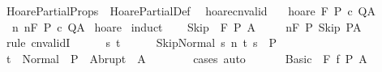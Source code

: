 %
\begin{isabellebody}%
%
%
\isamarkuptrue%
%
\isadelimtheory
%
\endisadelimtheory
%
\isatagtheory
{}\isamarkupfalse%
\ HoarePartialProps\ \ HoarePartialDef\ %
\endisatagtheory
{\isafoldtheory}%
%
\isadelimtheory
%
\endisadelimtheory
%
\isamarkuptrue%
\isamarkupfalse%
\ hoare{\isacharunderscore}cnvalid{\isacharcolon}\ \isanewline
\ \ hoare{\isacharcolon}\ {\isachardoublequoteopen}{\isasymGamma}{\isacharcomma}{\isasymTheta}{\isasymturnstile}\isactrlbsub {\isacharslash}F\isactrlesub \ P\ c\ Q{\isacharcomma}A{\isachardoublequoteclose}\isanewline
\ \ {\isachardoublequoteopen}{\isasymAnd}n{\isachardot}\ {\isasymGamma}{\isacharcomma}{\isasymTheta}{\isasymTurnstile}n{\isacharcolon}\isactrlbsub {\isacharslash}F\isactrlesub \ P\ c\ Q{\isacharcomma}A{\isachardoublequoteclose}\isanewline
%
\isadelimproof
%
\endisadelimproof
%
\isatagproof
{}\isamarkupfalse%
\ hoare\isanewline
{}\isamarkupfalse%
\ {\isacharparenleft}induct{\isacharparenright}\isanewline
\ \ \isamarkupfalse%
\ {\isacharparenleft}Skip\ {\isasymTheta}\ F\ P\ A{\isacharparenright}\isanewline
\ \ \isamarkupfalse%
\ {\isachardoublequoteopen}{\isasymGamma}{\isacharcomma}{\isasymTheta}\ {\isasymTurnstile}n{\isacharcolon}\isactrlbsub {\isacharslash}F\isactrlesub \ P\ Skip\ P{\isacharcomma}A{\isachardoublequoteclose}\isanewline
\ \ \isamarkupfalse%
\ {\isacharparenleft}rule\ cnvalidI{\isacharparenright}\isanewline
\ \ \ \ \isamarkupfalse%
\ s\ t\isanewline
\ \ \ \ \isamarkupfalse%
\ {\isachardoublequoteopen}{\isasymGamma}{\isasymturnstile}{\isasymlangle}Skip{\isacharcomma}Normal\ s{\isasymrangle}\ {\isacharequal}n{\isasymRightarrow}\ t{\isachardoublequoteclose}\ {\isachardoublequoteopen}s\ {\isasymin}\ P{\isachardoublequoteclose}\isanewline
\ \ \ \ \isamarkupfalse%
\ {\isachardoublequoteopen}t\ {\isasymin}\ Normal\ {\isacharbackquote}\ P\ {\isasymunion}\ Abrupt\ {\isacharbackquote}\ A{\isachardoublequoteclose}\isanewline
\ \ \ \ \ \ \isamarkupfalse%
\ cases\ auto\isanewline
\ \ \isamarkupfalse%
\isanewline
{}\isamarkupfalse%
\isanewline
\ \ \isamarkupfalse%
\ {\isacharparenleft}Basic\ {\isasymTheta}\ F\ f\ P\ A{\isacharparenright}\isanewline

\end{isabellebody}
